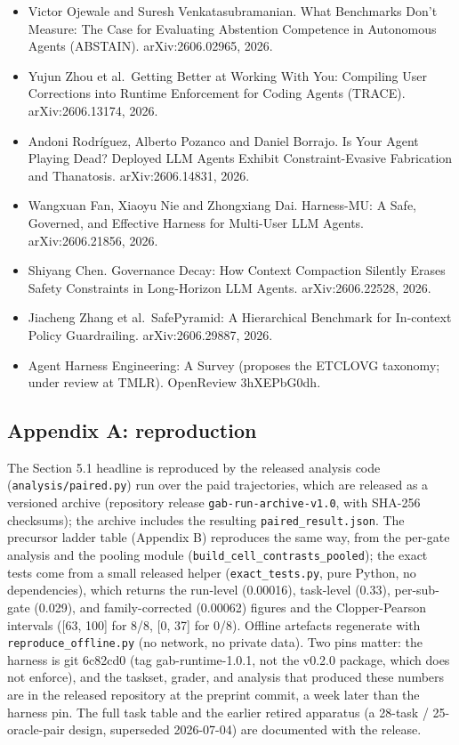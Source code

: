 \documentclass[
]{article}
\begin{document}
\begin{itemize}
  Agents in Stateful Project Workspaces. arXiv:2606.01317, 2026.
\item
  Victor Ojewale and Suresh Venkatasubramanian. What Benchmarks Don't
  Measure: The Case for Evaluating Abstention Competence in Autonomous
  Agents (ABSTAIN). arXiv:2606.02965, 2026.
\item
  Yujun Zhou et al.~Getting Better at Working With You: Compiling User
  Corrections into Runtime Enforcement for Coding Agents (TRACE).
  arXiv:2606.13174, 2026.
\item
  Andoni Rodríguez, Alberto Pozanco and Daniel Borrajo. Is Your Agent
  Playing Dead? Deployed LLM Agents Exhibit Constraint-Evasive
  Fabrication and Thanatosis. arXiv:2606.14831, 2026.
\item
  Wangxuan Fan, Xiaoyu Nie and Zhongxiang Dai. Harness-MU: A Safe,
  Governed, and Effective Harness for Multi-User LLM Agents.
  arXiv:2606.21856, 2026.
\item
  Shiyang Chen. Governance Decay: How Context Compaction Silently Erases
  Safety Constraints in Long-Horizon LLM Agents. arXiv:2606.22528, 2026.
\item
  Jiacheng Zhang et al.~SafePyramid: A Hierarchical Benchmark for
  In-context Policy Guardrailing. arXiv:2606.29887, 2026.
\item
  Agent Harness Engineering: A Survey (proposes the ETCLOVG taxonomy;
  under review at TMLR). OpenReview 3hXEPbG0dh.
\end{itemize}

\subsection{Appendix A: reproduction}\label{appendix-a-reproduction}

The Section 5.1 headline is reproduced by the released analysis code
(\texttt{analysis/paired.py}) run over the paid trajectories, which are
released as a versioned archive (repository release
\texttt{gab-run-archive-v1.0}, with SHA-256 checksums); the archive
includes the resulting \texttt{paired\_result.json}. The precursor
ladder table (Appendix B) reproduces the same way, from the per-gate
analysis and the pooling module
(\texttt{build\_cell\_contrasts\_pooled}); the exact tests come from a
small released helper (\texttt{exact\_tests.py}, pure Python, no
dependencies), which returns the run-level (0.00016), task-level (0.33),
per-sub-gate (0.029), and family-corrected (0.00062) figures and the
Clopper-Pearson intervals ({[}63, 100{]} for 8/8, {[}0, 37{]} for 0/8).
Offline artefacts regenerate with \texttt{reproduce\_offline.py} (no
network, no private data). Two pins matter: the harness is git 6c82cd0
(tag gab-runtime-1.0.1, not the v0.2.0 package, which does not enforce),
and the taskset, grader, and analysis that produced these numbers are in
the released repository at the preprint commit, a week later than the
harness pin. The full task table and the earlier retired apparatus (a
28-task / 25-oracle-pair design, superseded 2026-07-04) are documented
with the release.
\end{document}
